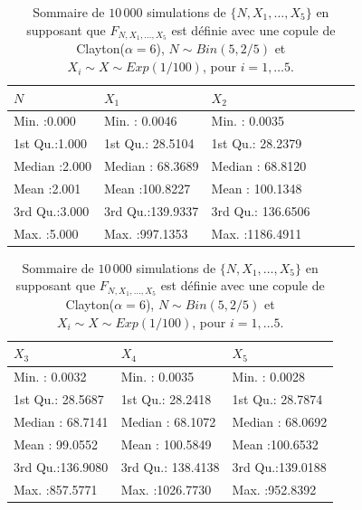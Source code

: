 \documentclass{article}
\begin{document}
		\begin{table}[H]
			\centering
			\begin{tabular}[width=\textwidth]{llllll}
				\hline
				       $N$ &       $X_1$ &       $X_2$ &             \\ 
				\hline
				Min.   :0.000   & Min.   :  0.0046   & Min.   :   0.0035      \\ 
				1st Qu.:1.000   & 1st Qu.: 28.5104   & 1st Qu.:  28.2379      \\ 
				Median :2.000   & Median : 68.3689   & Median :  68.8120      \\ 
				Mean   :2.001   & Mean   :100.8227   & Mean   : 100.1348      \\ 
				3rd Qu.:3.000   & 3rd Qu.:139.9337   & 3rd Qu.: 136.6506      \\ 
				Max.   :5.000   & Max.   :997.1353   & Max.   :1186.4911      \\ 
				\hline
			\end{tabular}
			\begin{tabular}[width=\textwidth]{lll}
				\hline
				       $X_3$ &       $X_4$ &       $X_5$ \\ 
				\hline
				 Min.   :  0.0032   & Min.   :   0.0035   & Min.   :  0.0028   \\ 
				 1st Qu.: 28.5687   & 1st Qu.:  28.2418   & 1st Qu.: 28.7874   \\ 
				 Median : 68.7141   & Median :  68.1072   & Median : 68.0692   \\ 
				 Mean   : 99.0552   & Mean   : 100.5849   & Mean   :100.6532   \\ 
				 3rd Qu.:136.9080   & 3rd Qu.: 138.4138   & 3rd Qu.:139.0188   \\ 
				 Max.   :857.5771   & Max.   :1026.7730   & Max.   :952.8392   \\ 
				\hline
			\end{tabular}
		\caption[Sommaire des données simulées pour le scénario \ref{scenario_Clayton_Binom}]{Sommaire de $10\,000$ simulations de $\{N, X_1, \dots, X_5\}$ en supposant que $F_{N,X_1,\dots, X_5}$ est définie avec une copule de Clayton($\alpha=6$), $N \sim Bin(5, 2/5)$ et $X_i \sim X \sim Exp(1/100)$, pour $i=1,\dots 5$.}
		\label{tbl_sommaire_Clayton_Binom}
		\end{table}
	
\end{document}
